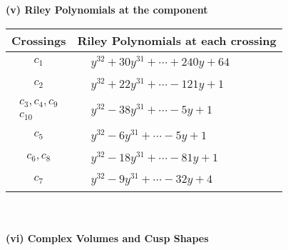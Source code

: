 \documentclass[1p]{elsarticle_modified}
\theoremstyle{definition}
\begin{document}
\newpage\renewcommand{\arraystretch}{1}
\flushleft \textbf{(v) Riley Polynomials at the component}\newline \\
\begin{tabular}{m{50pt}|m{274pt}}
Crossings & \hspace{64pt}Riley Polynomials at each crossing \\
\hline $$\begin{aligned}c_{1}\end{aligned}$$&$\begin{aligned}
&y^{32}+30 y^{31}+\cdots+240 y+64
\end{aligned}$\\
\hline $$\begin{aligned}c_{2}\end{aligned}$$&$\begin{aligned}
&y^{32}+22 y^{31}+\cdots-121 y+1
\end{aligned}$\\
\hline $$\begin{aligned}c_{3},c_{4},c_{9}\\c_{10}\end{aligned}$$&$\begin{aligned}
&y^{32}-38 y^{31}+\cdots-5 y+1
\end{aligned}$\\
\hline $$\begin{aligned}c_{5}\end{aligned}$$&$\begin{aligned}
&y^{32}-6 y^{31}+\cdots-5 y+1
\end{aligned}$\\
\hline $$\begin{aligned}c_{6},c_{8}\end{aligned}$$&$\begin{aligned}
&y^{32}-18 y^{31}+\cdots-81 y+1
\end{aligned}$\\
\hline $$\begin{aligned}c_{7}\end{aligned}$$&$\begin{aligned}
&y^{32}-9 y^{31}+\cdots-32 y+4
\end{aligned}$\\
\hline
\end{tabular}\\~\\
\newpage\flushleft \textbf{(vi) Complex Volumes and Cusp Shapes}
\end{document}
